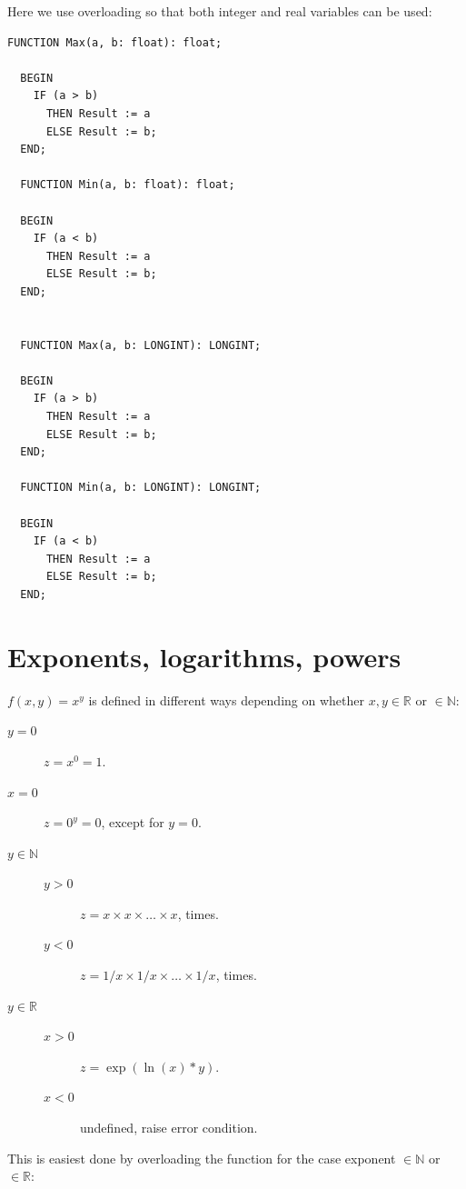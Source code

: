 \begin{refsection}
Here we use overloading so that both integer and real variables can be used:

\begin{lstlisting}[caption=Maximum and minimum]
  FUNCTION Max(a, b: float): float;

  BEGIN
    IF (a > b)
      THEN Result := a
      ELSE Result := b;
  END;

  FUNCTION Min(a, b: float): float;

  BEGIN
    IF (a < b)
      THEN Result := a
      ELSE Result := b;
  END;


  FUNCTION Max(a, b: LONGINT): LONGINT;

  BEGIN
    IF (a > b)
      THEN Result := a
      ELSE Result := b;
  END;

  FUNCTION Min(a, b: LONGINT): LONGINT;

  BEGIN
    IF (a < b)
      THEN Result := a
      ELSE Result := b;
  END;
\end{lstlisting}


\section{Exponents, logarithms, powers}

\( f(x,y) = x^y \) is defined in different ways depending on whether \(x, y \in \mathbb{R} \) or \(\in \mathbb{N} \):
\begin{description}
  \item[ \( y = 0 \)]{\(z = x^0 = 1 \).}
  \item[ \( x = 0 \)]{\(z = 0^y = 0 \), except for \(y=0 \).}
  \item[ \( y \in \mathbb{N} \)]{\hspace{10mm}
    \begin{description}
       \item[\( y > 0 \)]{\( z = x \times x \times \ldots \times x \),  times.}
       \item[\(y < 0 \)]{ \(z = 1/x \times 1/x \times \ldots \times 1/x \),  times.}
    \end{description}}
  \item[\(y \in \mathbb{R} \)]{\hspace{10mm}
    \begin{description}
       \item[\(x > 0 \)]{\(z = \exp(\ln(x) * y) \).}
       \item[\(x < 0 \)]{ undefined, raise error condition.}
    \end{description}}
\end{description}
This is easiest done by overloading the function for the case exponent \( \in \mathbb{N} \) or \( \in \mathbb{R} \):


\end{refsection}
